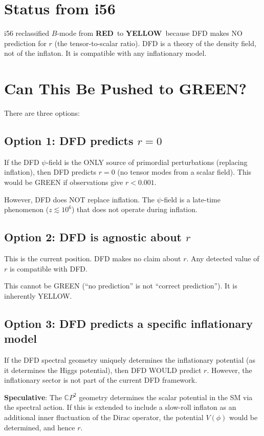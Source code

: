 \documentclass[11pt,a4paper]{article}
\newcommand{\YELLOW}{\textcolor{dfdyellow}{\textbf{YELLOW}}}
\newcommand{\RED}{\textcolor{dfdred}{\textbf{RED}}}
\newcommand{\CP}{\mathbb{C}P}
\begin{document}
\section{Status from i56}

i56 reclassified $B$-mode from \RED\ to \YELLOW\ because DFD makes NO prediction for $r$ (the tensor-to-scalar ratio). DFD is a theory of the density field, not of the inflaton. It is compatible with any inflationary model.

\section{Can This Be Pushed to GREEN?}

There are three options:

\subsection{Option 1: DFD predicts $r = 0$}

If the DFD $\psi$-field is the ONLY source of primordial perturbations (replacing inflation), then DFD predicts $r = 0$ (no tensor modes from a scalar field). This would be GREEN if observations give $r < 0.001$.

However, DFD does NOT replace inflation. The $\psi$-field is a late-time phenomenon ($z \lesssim 10^6$) that does not operate during inflation.

\subsection{Option 2: DFD is agnostic about $r$}

This is the current position. DFD makes no claim about $r$. Any detected value of $r$ is compatible with DFD.

This cannot be GREEN (``no prediction'' is not ``correct prediction''). It is inherently YELLOW.

\subsection{Option 3: DFD predicts a specific inflationary model}

If the DFD spectral geometry uniquely determines the inflationary potential (as it determines the Higgs potential), then DFD WOULD predict $r$. However, the inflationary sector is not part of the current DFD framework.

\textbf{Speculative}: The $\CP^2$ geometry determines the scalar potential in the SM via the spectral action. If this is extended to include a slow-roll inflaton as an additional inner fluctuation of the Dirac operator, the potential $V(\phi)$ would be determined, and hence $r$.
\end{document}
